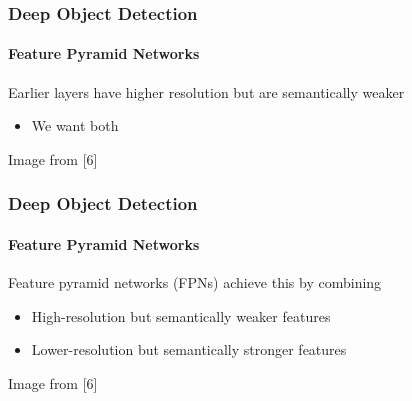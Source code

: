 \documentclass[xetex,professionalfont]{beamer}
\renewcommand\emph[1]{\textcolor{tuwcvl_cvl_blue}{#1}}
\begin{document}
\begin{frame}
	\frametitle{Deep Object Detection}
	\framesubtitle{Feature Pyramid Networks}

	Earlier layers have higher resolution but are semantically weaker
	\begin{itemize}
		\item We want both
	\end{itemize}

	\bigskip

	\begin{center}
		{\centering Image from [6]}
	\end{center}

\end{frame}


\begin{frame}
	\frametitle{Deep Object Detection}
	\framesubtitle{Feature Pyramid Networks}

	\emph{Feature pyramid networks} (\emph{FPNs}) achieve this by combining
	\begin{itemize}
		\item High-resolution but semantically weaker features
		\item Lower-resolution but semantically stronger features
	\end{itemize}

	\bigskip

	\begin{center}
		{\centering Image from [6]}
	\end{center}

\end{frame}
\end{document}
